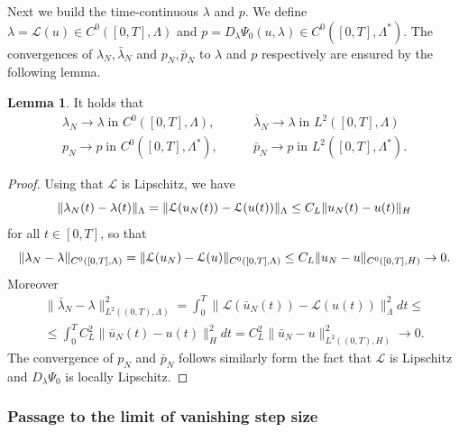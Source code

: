 \documentclass[a4paper,10pt,oneside]{amsbook}
\numberwithin{section}{chapter}
\numberwithin{equation}{chapter}
\theoremstyle{definition}
\newtheorem{lemma}[prop]{Lemma}
\DeclarePairedDelimiter{\norm}{\lVert}{\rVert}
\begin{document}
Next we build the time-continuous $\lambda$ and $p$. We define $\lambda=\mathcal{L}(u)\in C^0([0,T],\Lambda)$ and $p=D_\lambda\Psi_0(u,\lambda)\in C^0([0,T],\Lambda^*)$. The convergences of $\lambda_N,\bar\lambda_N$ and $p_N,\bar p_N$ to $\lambda$ and $p$ respectively are ensured by the following lemma.
\begin{lemma}
It holds that
\begin{align}
\lambda_N\to\lambda\;\text{in $C^0([0,T],\Lambda)$},\qquad & \bar\lambda_N\to\lambda\;\text{in $L^2([0,T],\Lambda)$} \\
p_N\to p\;\text{in $C^0([0,T],\Lambda^*)$},\qquad & \bar p_N\to p\;\text{in $L^2([0,T],\Lambda^*)$}.
\end{align}
\end{lemma}
\begin{proof}
Using that $\mathcal{L}$ is Lipschitz, we have
\[
\norm{\lambda_N(t)-\lambda(t)}_\Lambda=\norm{\mathcal{L}(u_N(t))-\mathcal{L}(u(t))}_\Lambda\le C_L\norm{u_N(t)-u(t)}_H
\]
for all $t\in[0,T]$, so that
\[
\norm{\lambda_N-\lambda}_{C^0([0,T],\Lambda)}=\norm{\mathcal{L}(u_N)-\mathcal{L}(u)}_{C^0([0,T],\Lambda)}\le C_L\norm{u_N-u}_{C^0([0,T],H)}\to0.
\]
Moreover
\[
\begin{split}
\|\bar{\lambda}_N-\lambda\|_{L^2((0,T),\Lambda)}^2=\int_0^T\|\mathcal{L}(\bar{u}_N(t))-\mathcal{L}(u(t))\|_\Lambda^2dt\le\\
\le\int_0^TC_L^2\|\bar{u}_N(t)-u(t)\|_H^2dt=C_L^2\|\bar{u}_N-u\|_{L^2((0,T),H)}^2\to0.
\end{split}
\]
The convergence of $p_N$ and $\bar p_N$ follows similarly form the fact that $\mathcal{L}$ is Lipschitz and $D_\lambda\Psi_0$ is locally Lipschitz.
\end{proof}

\subsubsection*{Passage to the limit of vanishing step size}
\end{document}

